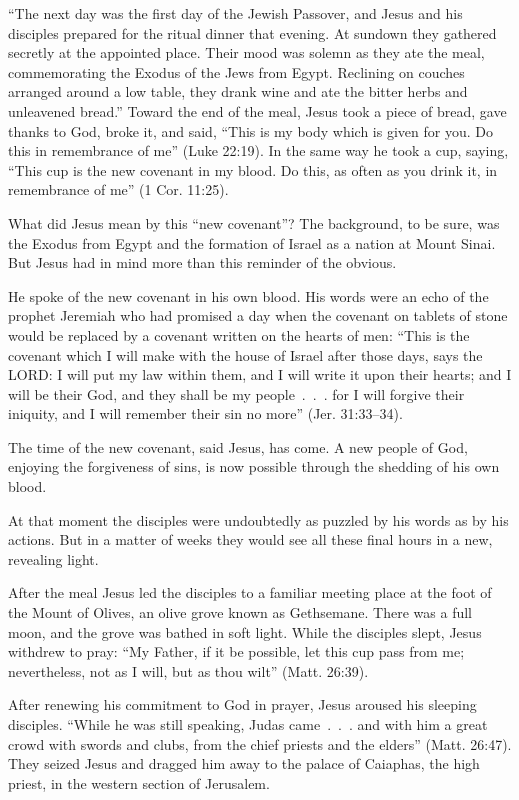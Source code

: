 “The next day was the first day of the Jewish Passover, and Jesus and his disciples prepared for the
ritual dinner that evening. At sundown they gathered secretly at the appointed place. Their mood was
solemn as they ate the meal, commemorating the Exodus of the Jews from Egypt. Reclining on couches
arranged around a low table, they drank wine and ate the bitter herbs and unleavened bread.” Toward
the end of the meal, Jesus took a piece of bread, gave thanks to God, broke it, and said, “This is
my body which is given for you. Do this in remembrance of me” (Luke 22:19). In the same way he took
a cup, saying, “This cup is the new covenant in my blood. Do this, as often as you drink it, in
remembrance of me” (1 Cor. 11:25).

What did Jesus mean by this “new covenant”? The background, to be sure, was the Exodus from Egypt
and the formation of Israel as a nation at Mount Sinai. But Jesus had in mind more than this
reminder of the obvious.

He spoke of the new covenant in his own blood. His words were an echo of the prophet Jeremiah who
had promised a day when the covenant on tablets of stone would be replaced by a covenant written on
the hearts of men: “This is the covenant which I will make with the house of Israel after those
days, says the LORD: I will put my law within them, and I will write it upon their hearts; and I
will be their God, and they shall be my people~.~.~. for I will forgive their iniquity, and I will
remember their sin no more” (Jer. 31:33–34).

The time of the new covenant, said Jesus, has come. A new people of God, enjoying the forgiveness of
sins, is now possible through the shedding of his own blood.

At that moment the disciples were undoubtedly as puzzled by his words as by his actions. But in a
matter of weeks they would see all these final hours in a new, revealing light.

After the meal Jesus led the disciples to a familiar meeting place at the foot of the Mount of
Olives, an olive grove known as Gethsemane. There was a full moon, and the grove was bathed in soft
light. While the disciples slept, Jesus withdrew to pray: “My Father, if it be possible, let this
cup pass from me; nevertheless, not as I will, but as thou wilt” (Matt. 26:39).

After renewing his commitment to God in prayer, Jesus aroused his sleeping disciples. “While he was
still speaking, Judas came~.~.~. and with him a great crowd with swords and clubs, from the chief
priests and the elders” (Matt. 26:47). They seized Jesus and dragged him away to the palace of
Caiaphas, the high priest, in the western section of Jerusalem.

